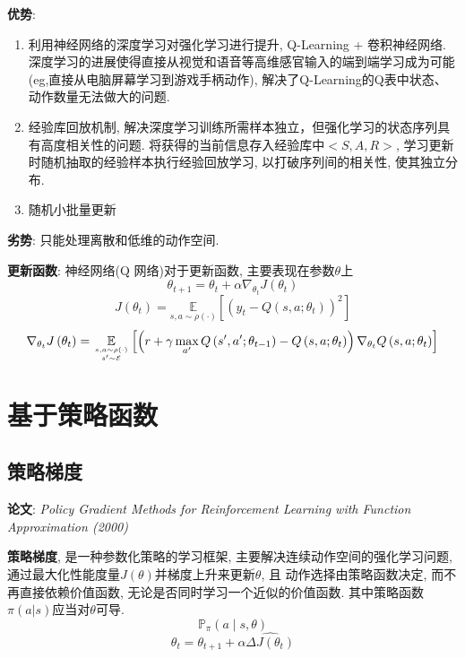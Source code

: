 \documentclass{article}
\begin{document}
            \textbf{优势}:
            \begin{enumerate}
                \item 利用神经网络的深度学习对强化学习进行提升, Q-Learning + 卷积神经网络. 深度学习的进展使得直接从视觉和语音等高维感官输入的端到端学习成为可能 (eg,直接从电脑屏幕学习到游戏手柄动作), 解决了Q-Learning的Q表中状态、动作数量无法做大的问题.
                \item 经验库回放机制, 解决深度学习训练所需样本独立，但强化学习的状态序列具有高度相关性的问题. 将获得的当前信息存入经验库中$<S, A, R>$, 学习更新时随机抽取的经验样本执行经验回放学习, 以打破序列间的相关性, 使其独立分布.
                \item 随机小批量更新
            \end{enumerate}

            \textbf{劣势}: 只能处理离散和低维的动作空间.
        
            \textbf{更新函数}: 神经网络(Q 网络)对于更新函数, 主要表现在参数$\theta$上
                $$\theta_{t+1} = \theta_{t} + \alpha \nabla_{\theta_{t}} J\left(\theta_{t}\right)$$
                $$J\left(\theta_{t}\right)=\underset{s, a \sim \rho(\cdot)}{\mathbb{E}} \left[\left(y_{t}-Q\left(s, a ; \theta_{t}\right)\right)^{2}\right]$$
                $$\nabla_{\theta_{t}} J\left(\theta_{t}\right)=\underset{s, a \sim \rho(\cdot) \atop s^{\prime} \sim \mathcal{E}}{\mathbb{E}}\left[\left(r+\gamma \max _{a^{\prime}} Q\left(s^{\prime}, a^{\prime} ; \theta_{t-1}\right)-Q\left(s, a ; \theta_{t}\right)\right) \nabla_{\theta_{t}} Q\left(s, a ; \theta_{t}\right)\right]$$


\section{基于策略函数}

    \subsection{策略梯度}
        \textbf{论文}: \textit{Policy Gradient Methods for Reinforcement Learning with Function Approximation (2000)}

        \textbf{策略梯度}, 是一种参数化策略的学习框架, 主要解决连续动作空间的强化学习问题,  通过最大化性能度量$J(\theta)$并梯度上升来更新$\theta$, 且 动作选择由策略函数决定, 而不再直接依赖价值函数, 无论是否同时学习一个近似的价值函数. 其中策略函数$\pi(a|s)$应当对$\theta$可导.
            $$\mathbb{P}_\pi (a \mid s, \theta)$$
            $$ \theta_t = \theta_{t+1} + \alpha  \widehat{\Delta J(\theta_t)}$$
        
\end{document}
